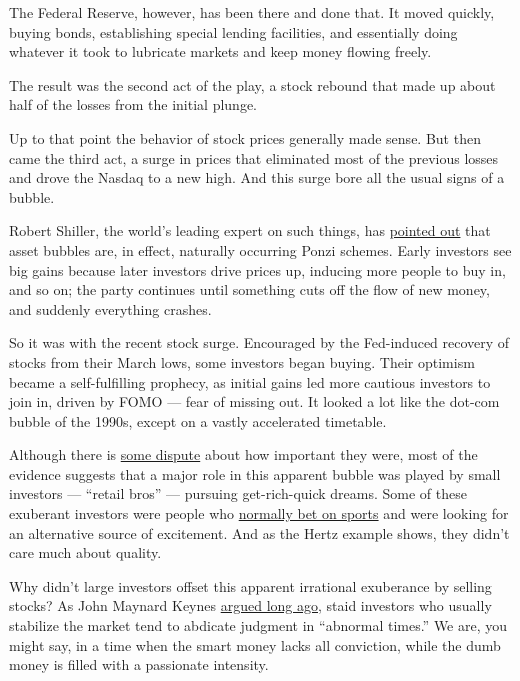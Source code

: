 The Federal Reserve, however, has been there and done that. It moved
quickly, buying bonds, establishing special lending facilities, and
essentially doing whatever it took to lubricate markets and keep money
flowing freely.

The result was the second act of the play, a stock rebound that made up
about half of the losses from the initial plunge.

Up to that point the behavior of stock prices generally made sense. But
then came the third act, a surge in prices that eliminated most of the
previous losses and drove the Nasdaq to a new high. And this surge bore
all the usual signs of a bubble.

Robert Shiller, the world's leading expert on such things, has
\href{https://www.jstor.org/stable/3216841?seq=1\#metadata_info_tab_contents}{pointed
out} that asset bubbles are, in effect, naturally occurring Ponzi
schemes. Early investors see big gains because later investors drive
prices up, inducing more people to buy in, and so on; the party
continues until something cuts off the flow of new money, and suddenly
everything crashes.

So it was with the recent stock surge. Encouraged by the Fed-induced
recovery of stocks from their March lows, some investors began buying.
Their optimism became a self-fulfilling prophecy, as initial gains led
more cautious investors to join in, driven by FOMO --- fear of missing
out. It looked a lot like the dot-com bubble of the 1990s, except on a
vastly accelerated timetable.

Although there is
\href{https://www.marketwatch.com/story/its-like-the-wild-west-in-the-stock-market-with-the-get-rich-crowd-vs-wall-st-pros-but-its-too-easy-to-blame-retail-investors-for-rampant-speculation-2020-06-13}{some
dispute} about how important they were, most of the evidence suggests
that a major role in this apparent bubble was played by small investors
--- ``retail bros'' --- pursuing get-rich-quick dreams. Some of these
exuberant investors were people who
\href{https://www.nytimes3xbfgragh.onion/2020/06/14/business/sports-gamblers-stocks-virus.html}{normally
bet on sports} and were looking for an alternative source of excitement.
And as the Hertz example shows, they didn't care much about quality.

Why didn't large investors offset this apparent irrational exuberance by
selling stocks? As John Maynard Keynes
\href{http://gutenberg.net.au/ebooks03/0300071h/chap12.html}{argued long
ago}, staid investors who usually stabilize the market tend to abdicate
judgment in ``abnormal times.'' We are, you might say, in a time when
the smart money lacks all conviction, while the dumb money is filled
with a passionate intensity.

